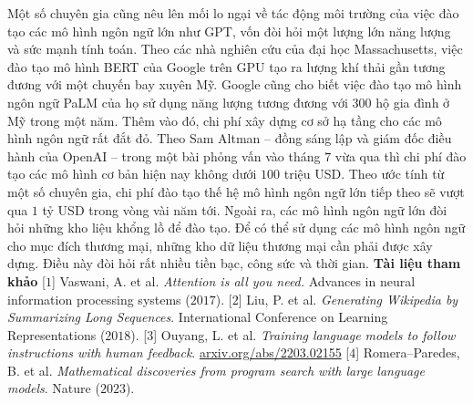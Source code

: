\begin{multicols}{2}
	\vskip 0.1cm
	Một số chuyên gia cũng nêu lên mối lo ngại về tác động môi trường của việc đào tạo các mô hình ngôn ngữ lớn như GPT, vốn đòi hỏi một lượng lớn năng lượng và sức mạnh tính toán. Theo các nhà nghiên cứu của đại học Massachusetts, việc đào tạo mô hình BERT của Google trên GPU tạo ra lượng khí thải gần tương đương với một chuyến bay xuyên Mỹ. Google cũng cho biết việc đào tạo mô hình ngôn ngữ PaLM của họ sử dụng năng lượng tương đương với $300$ hộ gia đình ở Mỹ trong một năm. 
	\vskip 0.1cm
	Thêm vào đó, chi phí xây dựng cơ sở hạ tầng cho các mô hình ngôn ngữ rất đắt đỏ. Theo Sam Altman -- đồng sáng lập và giám đốc điều hành của OpenAI -- trong một bài phỏng vấn vào tháng $7$ vừa qua thì chi phí đào tạo các mô hình cơ bản hiện nay không dưới $100$ triệu USD. Theo ước tính từ một số chuyên gia, chi phí đào tạo thế hệ mô hình ngôn ngữ lớn tiếp theo sẽ vượt qua $1$ tỷ USD trong vòng vài năm tới. Ngoài ra, các mô hình ngôn ngữ lớn đòi hỏi những kho liệu khổng lồ để đào tạo. Để có thể sử dụng các mô hình ngôn ngữ cho mục đích thương mại, những kho dữ liệu thương mại cần phải được xây dựng. Điều này đòi hỏi rất nhiều tiền bạc, công sức và thời gian. 
	\vskip 0.1cm
	\textbf{\color{timhieukhoahoc}Tài liệu tham khảo}
	\vskip 0.1cm
	[$1$] Vaswani, A. et al. \textit{Attention is all you need.} Advances in neural information processing systems ($2017$).
	\vskip 0.1cm
	[$2$] Liu, P. et al. \textit{Generating Wikipedia by Summarizing Long Sequences}. International Conference on Learning Representations ($2018$).
	\vskip 0.1cm
	[$3$] Ouyang, L. et al. \textit{Training language models to follow instructions with human feedback}. \url{arxiv.org/abs/2203.02155}
	\vskip 0.1cm
	[$4$] Romera--Paredes, B. et al. \textit{Mathematical discoveries from program search with large language models}. Nature ($2023$).
\end{multicols}


